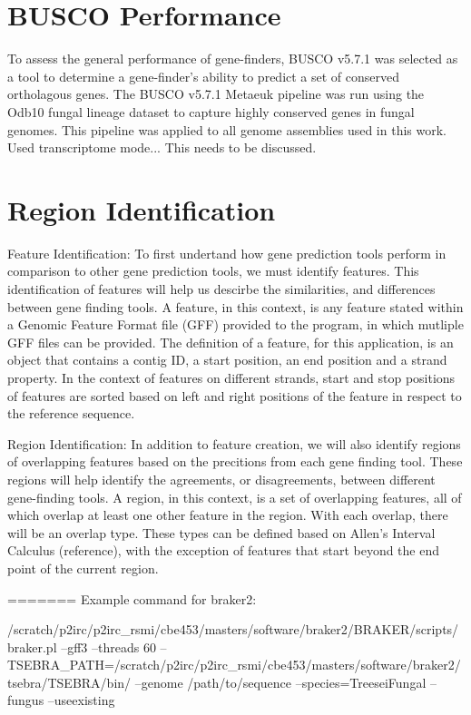 \section{BUSCO Performance}

To assess the general performance of gene-finders, BUSCO v5.7.1 was
selected as a tool to determine a gene-finder's ability to predict a
set of conserved ortholagous genes. The BUSCO v5.7.1 Metaeuk pipeline
was run using the Odb10 fungal lineage dataset to capture highly
conserved genes in fungal genomes. This pipeline was applied to all
genome assemblies used in this work. Used transcriptome mode... This needs to be discussed.

\section{Region Identification}

Feature Identification: To first undertand how gene prediction tools
perform in comparison to other gene prediction tools, we must identify
features. This identification of features will help us descirbe the
similarities, and differences between gene finding tools. A feature,
in this context, is any feature stated within a Genomic Feature Format
file (GFF) provided to the program, in which mutliple GFF files can be
provided. The definition of a feature, for this application, is an
object that contains a contig ID, a start position, an end position
and a strand property. In the context of features on different
strands, start and stop positions of features are sorted based on left
and right positions of the feature in respect to the reference
sequence.

Region Identification: In addition to feature creation, we will also
identify regions of overlapping features based on the precitions from
each gene finding tool. These regions will help identify the
agreements, or disagreements, between different gene-finding tools. A
region, in this context, is a set of overlapping features, all of
which overlap at least one other feature in the region. With each
overlap, there will be an overlap type. These types can be defined
based on Allen's Interval Calculus (reference), with the exception of
features that start beyond the end point of the current region.

=======
Example command for braker2:

/scratch/p2irc/p2irc\_rsmi/cbe453/masters/software/braker2/BRAKER/scripts/braker.pl
--gff3 --threads 60
--TSEBRA\_PATH=/scratch/p2irc/p2irc\_rsmi/cbe453/masters/software/braker2/tsebra/TSEBRA/bin/
--genome /path/to/sequence --species=TreeseiFungal --fungus
--useexisting

